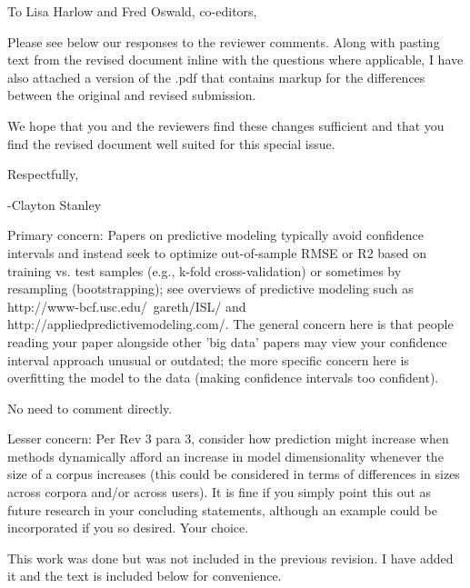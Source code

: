 \documentclass[answers,12pt]{exam}
\begin{document}
To Lisa	Harlow and Fred	Oswald,	co-editors, \bigskip

Please see below our responses to the reviewer comments.
Along with pasting text from the revised document inline with the questions where applicable,
I have also attached a version of the .pdf that contains markup for the differences between the original and revised submission. \bigskip 

We hope that you and the reviewers find these changes sufficient and that you find the revised document well suited for this special issue. \bigskip

Respectfully,

-Clayton Stanley

\bigskip
\bigskip

\begin{questions}

\question Primary concern: Papers on predictive modeling typically avoid confidence intervals and instead seek to optimize out-of-sample RMSE or R2 based on training vs. test samples (e.g., k-fold cross-validation) or sometimes by resampling (bootstrapping); see overviews of predictive modeling such as http://www-bcf.usc.edu/~gareth/ISL/ and http://appliedpredictivemodeling.com/.  The general concern here is that people reading your paper alongside other 'big data' papers may view your confidence interval approach unusual or outdated; the more specific concern here is overfitting the model to the data (making confidence intervals too confident).

\begin{solution}
No need to comment directly.
\end{solution}

\question Lesser concern: Per Rev 3 para 3, consider how prediction might increase when methods dynamically afford an increase in model dimensionality whenever the size of a corpus increases (this could be considered in terms of differences in sizes across corpora and/or across users). It is fine if you simply point this out as future research in your concluding statements, although an example could be incorporated if you so desired. Your choice.

\begin{solution}
This work was done but was not included in the previous revision.
I have added it and the text is included below for convenience.




\end{solution}


\end{questions}
\end{document}
